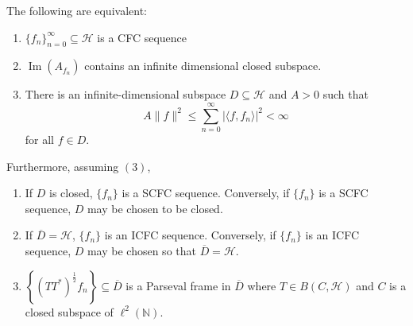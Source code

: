 \documentclass[10pt,a4paper]{amsart}
\newcommand{\Hcal}{\mathcal{H}} %
\begin{document}
\begin{thm}\label{mainclassthm}
The following are equivalent:
\begin{enumerate}
    \item $\{f_n\}_{n=0}^{\infty}\subseteq \Hcal$ is a CFC sequence
    \item $\operatorname{Im}(A_{f_n})$ contains an infinite dimensional closed subspace.
    \item There is an infinite-dimensional subspace $D\subseteq \Hcal$ and $A>0$ such that
$$A\|f\|^2 \leq \sum_{n=0}^{\infty}|\langle f, f_n\rangle|^{2}<\infty $$
for all $f\in D$.
    
\end{enumerate}

Furthermore, assuming $(3)$,
\begin{enumerate}
    \item If $D$ is closed, $\{f_n\}$ is a SCFC sequence. Conversely, if $\{f_n\}$ is a SCFC sequence, $D$ may be chosen to be closed.
    \item If $\overline{D}=\Hcal$, $\{f_n\}$ is an ICFC sequence. Conversely, if $\{f_n\}$ is an ICFC sequence, $D$ may be chosen so that $\overline{D}=\mathcal{H}.$
    \item 
   $\left\{(TT^{*})^{\frac{1}{2}}f_n  \right\}\subseteq \overline{D}$ is a Parseval frame in $\overline{D}$ where $T\in B(C, \Hcal)$ and $C$ is a closed subspace of $\ell^{2}(\mathbb{N})$.
\end{enumerate}

\end{thm}
\end{document}
